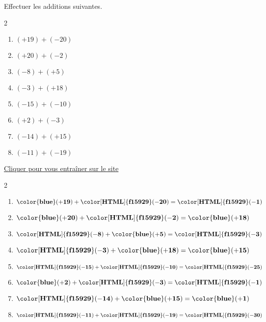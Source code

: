 \begin{exercice*}
    Effectuer les additions suivantes.
    \begin{multicols}2
        \begin{enumerate}            
                \item $ (+19) + (-20)$
                \item $ (+20) + (-2)$
                \item $ (-8) + (+5)$
                \item $ (-3) + (+18)$
                \item $ (-15) + (-10)$
                \item $ (+2) + (-3)$
                \item $ (-14) + (+15)$
                \item $ (-11) + (-19)$            
        \end{enumerate}
    \end{multicols}

    \href{https://coopmaths.fr/mathalea.html?ex=5R20,s=20,s2=false,s3=false,n=10,i=1&v=ex&z=1}{Cliquer pour vous entraîner sur le site \mathaleaLogo} 
\end{exercice*}
\begin{corrige}
    \phantom{rrr}    
    \begin{multicols}2
        \begin{enumerate}
            \item $ \mathbf{{\color{blue}(+19)}} + \mathbf{{\color[HTML]{f15929}(-20)}} = \mathbf{{\color[HTML]{f15929}(-1)}} $
            \item $ \mathbf{{\color{blue}(+20)}} + \mathbf{{\color[HTML]{f15929}(-2)}} = \mathbf{{\color{blue}(+18)}} $
            \item $ \mathbf{{\color[HTML]{f15929}(-8)}} + \mathbf{{\color{blue}(+5)}} = \mathbf{{\color[HTML]{f15929}(-3)}} $
            \item $ \mathbf{{\color[HTML]{f15929}(-3)}} + \mathbf{{\color{blue}(+18)}} = \mathbf{{\color{blue}(+15)}} $
            \item $ \mathbf{{\color[HTML]{f15929}(-15)}} + \mathbf{{\color[HTML]{f15929}(-10)}} = \mathbf{{\color[HTML]{f15929}(-25)}} $
            \item $ \mathbf{{\color{blue}(+2)}} + \mathbf{{\color[HTML]{f15929}(-3)}} = \mathbf{{\color[HTML]{f15929}(-1)}} $
            \item $ \mathbf{{\color[HTML]{f15929}(-14)}} + \mathbf{{\color{blue}(+15)}} = \mathbf{{\color{blue}(+1)}} $
            \item $ \mathbf{{\color[HTML]{f15929}(-11)}} + \mathbf{{\color[HTML]{f15929}(-19)}} = \mathbf{{\color[HTML]{f15929}(-30)}} $
        \end{enumerate}   
    \end{multicols}
\end{corrige}